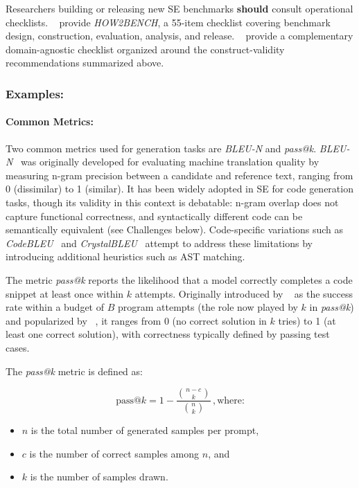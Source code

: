 \documentclass[smallextended]{svjour3}
\newcommand{\should}{\textbf{should}\xspace}
\newcommand{\guidelinesubsubsection}[1]{\subsubsection{\bfseries #1:}}
\newcommand{\guidelinesubsubsection}[1]{\subsubsection{#1}}
\begin{document}
Researchers building or releasing new SE benchmarks \should consult operational checklists. \citeauthor{cao2025should}~\cite{cao2025should} provide \emph{HOW2BENCH}, a 55-item checklist covering benchmark design, construction, evaluation, analysis, and release. \citeauthor{bean2025measuring}~\cite{bean2025measuring} provide a complementary domain-agnostic checklist organized around the construct-validity recommendations summarized above.

\guidelinesubsubsection{Examples}

\paragraph{Common Metrics:}

Two common metrics used for generation tasks are \emph{BLEU-N} and \emph{pass@k}.
\emph{BLEU-N}~\cite{DBLP:conf/acl/PapineniRWZ02} was originally developed for evaluating machine translation quality by measuring n-gram precision between a candidate and reference text, ranging from 0 (dissimilar) to 1 (similar). It has been widely adopted in SE for code generation tasks, though its validity in this context is debatable: n-gram overlap does not capture functional correctness, and syntactically different code can be semantically equivalent (see Challenges below).
Code-specific variations such as \emph{CodeBLEU}~\cite{DBLP:journals/corr/abs-2009-10297} and \emph{CrystalBLEU}~\cite{DBLP:conf/kbse/EghbaliP22} attempt to address these limitations by introducing additional heuristics such as AST matching.

The metric \emph{pass@k} reports the likelihood that a model correctly completes a code snippet at least once within $k$ attempts. Originally introduced by \citeauthor{DBLP:conf/nips/KulalPC0PAL19}~\cite{DBLP:conf/nips/KulalPC0PAL19} as the success rate within a budget of $B$ program attempts (the role now played by $k$ in \emph{pass@k}) and popularized by \citeauthor{DBLP:journals/corr/abs-2107-03374}~\cite{DBLP:journals/corr/abs-2107-03374}, it ranges from 0 (no correct solution in $k$ tries) to 1 (at least one correct solution), with correctness typically defined by passing test cases.

The \emph{pass@k} metric is defined as:

\[
\text{pass@}k = 1 - \frac{\binom{n-c}{k}}{\binom{n}{k}}\,, \text{where:}
\]

\begin{itemize}
  \item $n$ is the total number of generated samples per prompt,
  \item $c$ is the number of correct samples among $n$, and
  \item $k$ is the number of samples drawn.
\end{itemize}
\end{document}
